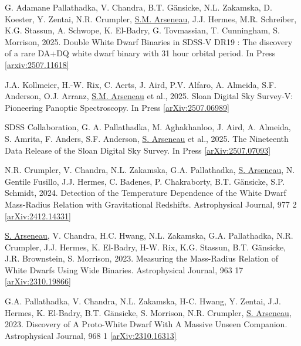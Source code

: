 \documentclass[letterpaper,11pt]{article}
\newenvironment{packed_enumerate}[1][]{
\begin{etaremune}[#1]
  \setlength{\itemsep}{3.7pt}
  \setlength{\parskip}{0pt}
  \setlength{\parsep}{0pt}}{\end{etaremune}
}
\begin{document}
\begin{packed_enumerate}

\item G. Adamane Pallathadka, V. Chandra, B.T. G\"ansicke, N.L. Zakamska, D. Koester, Y. Zentai, N.R. Crumpler, \underline{S.M. Arseneau}, J.J. Hermes, M.R. Schreiber, K.G. Stassun, A. Schwope, K. El-Badry, G. Tovmassian, T. Cunningham, S. Morrison, 2025. Double White Dwarf Binaries in SDSS-V DR19 : The discovery of a rare DA+DQ white dwarf binary with 31 hour orbital period. In Press \href{https://arxiv.org/abs/2507.11618}{[arxiv:2507.11618]}

\item  J.A. Kollmeier, H.-W. Rix, C. Aerts, J. Aird, P.V. Alfaro, A. Almeida, S.F. Anderson, O.J. Arranz, \underline{S.M. Arseneau} et al., 2025. Sloan Digital Sky Survey-V: Pioneering Panoptic Spectroscopy. In Press \href{https://https://arxiv.org/abs/2507.06989}{[arXiv:2507.06989]} 

\item  SDSS Collaboration, G. A. Pallathadka, M. Aghakhanloo, J. Aird, A. Almeida, S. Amrita, F. Anders, S.F. Anderson, \underline{S. Arseneau} et al., 2025. The Nineteenth Data Release of the Sloan Digital Sky Survey. In Press \href{https://https://arxiv.org/abs/2507.07093}{[arXiv:2507.07093]} 

\item  N.R. Crumpler, V. Chandra, N.L. Zakamska, G.A. Pallathadka, \underline{S. Arseneau}, N. Gentile Fusillo, J.J. Hermes, C. Badenes, P. Chakraborty, B.T. Gänsicke, S.P. Schmidt, 2024. Detection of the Temperature Dependence of the White Dwarf Mass-Radius Relation with Gravitational Redshifts. Astrophysical Journal, 977 2 \href{https://arxiv.org/abs/2412.14331}{[arXiv:2412.14331]} 

\item \underline{S. Arseneau}, V. Chandra, H.C. Hwang, N.L. Zakamska, G.A. Pallathadka, N.R. Crumpler, J.J. Hermes, K. El-Badry, H-W. Rix, K.G. Stassun, B.T. G\"ansicke, J.R. Brownstein, S. Morrison, 2023. Measuring the Mass-Radius Relation of White Dwarfs Using Wide Binaries. Astrophysical Journal, 963 17 \href{https://arxiv.org/abs/2310.19866}{[arXiv:2310.19866]}

\item G.A. Pallathadka, V. Chandra, N.L. Zakamska, H-C. Hwang, Y. Zentai, J.J. Hermes, K. El-Badry, B.T. G\"ansicke, S. Morrison, N.R. Crumpler, \underline{S. Arseneau}, 2023. Discovery of A Proto-White Dwarf With A Massive Unseen Companion. Astrophysical Journal, 968 1 \href{https://doi.org/10.48550/arXiv.2310.16313}{[arXiv:2310.16313]}


\end{packed_enumerate}
\end{document}

